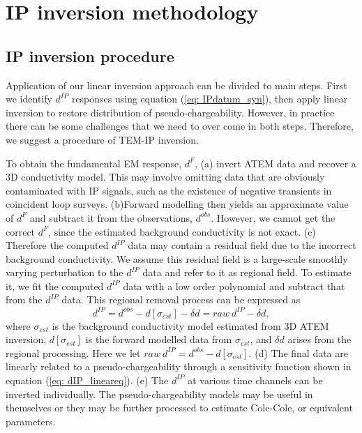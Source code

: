 \documentclass[a4paper, 11pt]{article}
\newcommand{\siginf}{\sigma_\infty}
\newcommand{\peta}{\tilde{\eta}}
\newcommand{\dip}{d^{IP}}
\begin{document}

\clearpage
\section{IP inversion methodology}
\subsection{IP inversion procedure}

Application of our linear inversion approach can be divided to main steps. First we identify $d^{IP}$ responses using equation (\ref{eq: IPdatum_syn}), then apply linear inversion to restore distribution of pseudo-chargeability. However, in practice there can be some challenges that we need to over come in both steps. Therefore, we suggest a procedure of TEM-IP inversion.

To obtain the fundamental EM response, $d^F$, (a) invert ATEM data and recover a 3D conductivity model. This may involve omitting data that are obviously contaminated
with IP signals, such as the existence of negative transients in coincident loop surveys. (b)Forward modelling then yields an approximate value of $d^F$ and subtract it from the observations, $d^{obs}$. However, we cannot get the correct $d^F$, since the estimated background conductivity is not exact. (c) Therefore the computed $d^{IP}$ data may contain a residual field due to the incorrect background conductivity. We assume this residual field is a large-scale smoothly varying perturbation to the $d^{IP}$ data and refer to it as regional field. To estimate it, we fit the computed $d^{IP}$ data with a low order polynomial and subtract that from the $d^{IP}$ data. This regional removal process can be expressed as
\begin{equation}
    d^{IP} = d^{obs} - d[\sigma_{est}] - \delta d = raw \ d^{IP} -  \delta d,
\end{equation}
where $\sigma_{est}$ is the background conductivity model estimated from 3D ATEM inversion, $d[\sigma_{est}]$ is the forward modelled data from $\sigma_{est}$, and $\delta d$ arises from the regional processing. Here we let $raw \ d^{IP}= d^{obs}- d[\sigma_{est}]$. (d) The final data are linearly related to a pseudo-chargeability through a sensitivity function shown in equation (\ref{eq: dIP_lineareq}). (e) The $\dip$ at various time channels can be inverted individually. The pseudo-chargeability models may be useful in themselves or they may be further processed to estimate Cole-Cole, or equivalent parameters.
\end{document}
